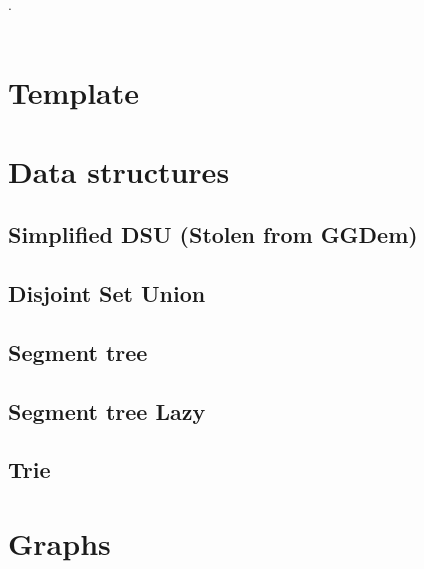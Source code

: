 

\def\title{Universidad Autonoma de Ciudad Juarez - First to Penalty}
.\\[0.2cm]
 \\[0.5cm]
\tableofcontents\newpage

\section{Template}
\section{Data structures}
\subsection{Simplified DSU (Stolen from GGDem)}
\subsection{Disjoint Set Union}
\subsection{Segment tree}
\subsection{Segment tree Lazy}
\subsection{Trie}


\section{Graphs}
